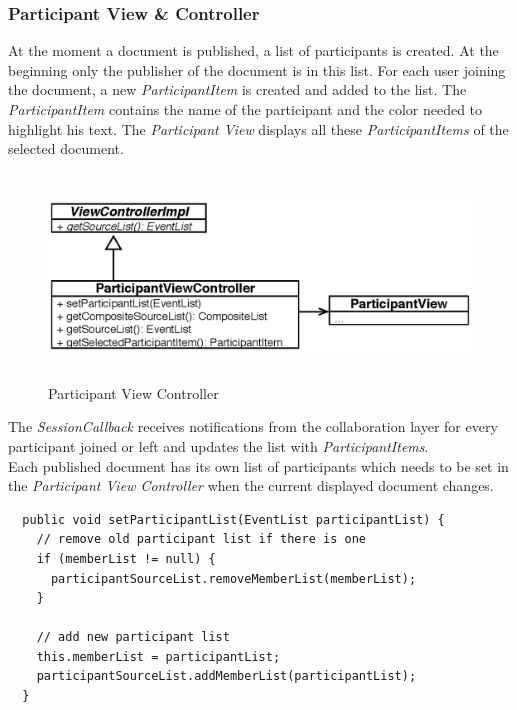\subsubsection{Participant View \& Controller}
At the moment a document is published, a list of participants is created. At the beginning only the publisher of the document is in this list.  For each user joining the document, a new \textit{ParticipantItem} is created and added to the list. The \textit{ParticipantItem} contains the name of the participant and the color needed to highlight his text. The \textit{Participant View} displays all these \textit{ParticipantItems} of the selected document.
\begin{figure}[H]
\begin{center}
  \includegraphics[height=2.15in, width=5.62in]{../images/finalreport/application_participantview.eps}
\caption{Participant View Controller}
\label{application_participantview}
\end{center}
\end{figure}
The \textit{SessionCallback} receives notifications from the collaboration layer for every participant joined or left and updates the list with \textit{ParticipantItems}. \\

Each published document has its own list of participants which needs to be set in the \textit{Participant View Controller} when the current displayed document changes.
\begin{verbatim}
  public void setParticipantList(EventList participantList) {
    // remove old participant list if there is one
    if (memberList != null) {
      participantSourceList.removeMemberList(memberList);
    }

    // add new participant list    
    this.memberList = participantList;
    participantSourceList.addMemberList(participantList);
  }
\end{verbatim}

